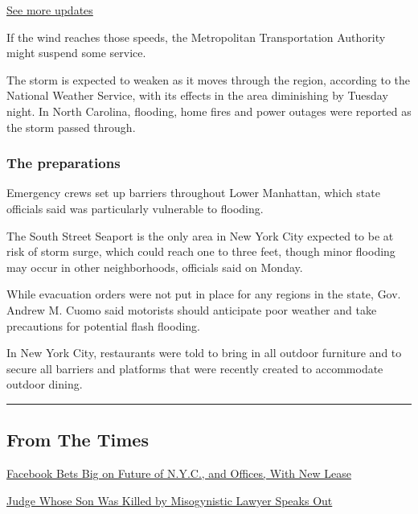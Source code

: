 \href{https://www.nytimes3xbfgragh.onion/2020/08/04/us/isaias-storm-updates.html?action=click\&pgtype=Article\&state=default\&region=MAIN_CONTENT_1\&context=storylines_live_updates}{See
more updates}

If the wind reaches those speeds, the Metropolitan Transportation
Authority might suspend some service.

The storm is expected to weaken as it moves through the region,
according to the National Weather Service, with its effects in the area
diminishing by Tuesday night. In North Carolina, flooding, home fires
and power outages were reported as the storm passed through.

\hypertarget{the-preparations}{%
\subsubsection{The preparations}\label{the-preparations}}

Emergency crews set up barriers throughout Lower Manhattan, which state
officials said was particularly vulnerable to flooding.

The South Street Seaport is the only area in New York City expected to
be at risk of storm surge, which could reach one to three feet, though
minor flooding may occur in other neighborhoods, officials said on
Monday.

While evacuation orders were not put in place for any regions in the
state, Gov. Andrew M. Cuomo said motorists should anticipate poor
weather and take precautions for potential flash flooding.

In New York City, restaurants were told to bring in all outdoor
furniture and to secure all barriers and platforms that were recently
created to accommodate outdoor dining.

\begin{center}\rule{0.5\linewidth}{\linethickness}\end{center}

\hypertarget{from-the-times}{%
\subsection{From The Times}\label{from-the-times}}

\href{https://www.nytimes3xbfgragh.onion/2020/08/03/nyregion/facebook-nyc-office-farley-building.html}{Facebook
Bets Big on Future of N.Y.C., and Offices, With New Lease}

\href{https://www.nytimes3xbfgragh.onion/2020/08/03/nyregion/esther-salas-roy-den-hollander.html}{Judge
Whose Son Was Killed by Misogynistic Lawyer Speaks Out}


